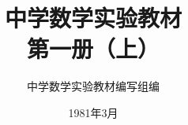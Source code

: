 \documentclass[b5paper, openany, fontset=fandol]{ctexbook}
\theoremstyle{plain}
\begin{document}
\title{\Huge\bfseries 中学数学实验教材\\第一册（上）}



\author{\Large 中学数学实验教材编写组编}
\date{\Large 1981年3月}

\maketitle




\frontmatter


\tableofcontents


\mainmatter

 
 
% 
%
%
%
%
\end{document}

